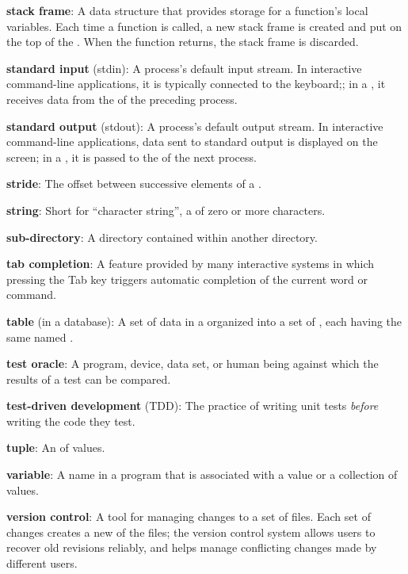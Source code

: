 \documentclass{book}
\begin{document}
\textbf{stack frame}: A data structure that provides storage for a
function's local variables. Each time a function is called, a new stack
frame is created and put on the top of the . When the function returns, the stack frame is discarded.

\textbf{standard input} (stdin): A process's default input stream. In
interactive command-line applications, it is typically connected to the
keyboard;; in a , it receives data from the
 of the preceding process.

\textbf{standard output} (stdout): A process's default output stream. In
interactive command-line applications, data sent to standard output is
displayed on the screen; in a , it is passed to
the  of the next process.

\textbf{stride}: The offset between successive elements of a
.

\textbf{string}: Short for ``character string'', a
 of zero or more characters.

\textbf{sub-directory}: A directory contained within another directory.

\textbf{tab completion}: A feature provided by many interactive systems
in which pressing the Tab key triggers automatic completion of the
current word or command.

\textbf{table} (in a database): A set of data in a
 organized into a
set of , each having the same named
.

\textbf{test oracle}: A program, device, data set, or human being
against which the results of a test can be compared.

\textbf{test-driven development} (TDD): The practice of writing unit
tests \emph{before} writing the code they test.

\textbf{tuple}: An 
 of values.

\textbf{variable}: A name in a program that is associated with a value
or a collection of values.

\textbf{version control}: A tool for managing changes to a set of files.
Each set of changes creates a new  of the
files; the version control system allows users to recover old revisions
reliably, and helps manage conflicting changes made by different users.
\end{document}
